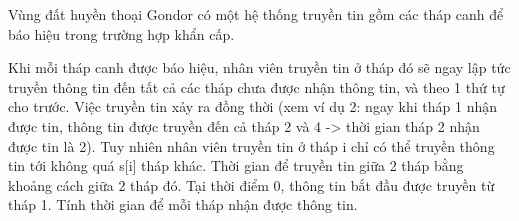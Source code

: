 Vùng đất huyền thoại Gondor có một hệ thống truyền tin gồm các tháp canh để báo hiệu trong trường hợp khẩn cấp.

Khi mỗi tháp canh được báo hiệu, nhân viên truyền tin ở tháp đó sẽ ngay lập tức truyền thông tin đến tất cả các tháp chưa được nhận thông tin, và theo 1 thứ tự cho trước. Việc truyền tin xảy ra đồng thời (xem ví dụ 2: ngay khi tháp 1 nhận được tin, thông tin được truyền đến cả tháp 2 và 4 -> thời gian tháp 2 nhận được tin là 2). Tuy nhiên nhân viên truyền tin ở tháp i chỉ có thể truyền thông tin tới không quá s[i] tháp khác. Thời gian để truyền tin giữa 2 tháp bằng khoảng cách giữa 2 tháp đó. Tại thời điểm 0, thông tin bắt đầu được truyền từ tháp 1. Tính thời gian để mỗi tháp nhận được thông tin.
